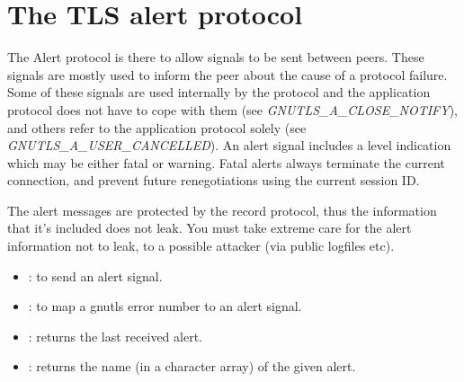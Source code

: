 \section{The TLS alert protocol}
\label{alert}

The Alert protocol
is there to allow signals to be sent between peers.
These signals are mostly used to inform the peer about the cause of
a protocol failure. Some of these signals are used internally by the
protocol and the application protocol does not have to cope with them
(see \emph{GNUTLS\_A\_CLOSE\_NOTIFY}), and others refer to the
application protocol solely (see \emph{GNUTLS\_A\_USER\_CANCELLED}).
An alert signal includes a level indication which may be either
fatal or warning. Fatal alerts always terminate the current connection,
and prevent future renegotiations using the current session ID.

\par The alert messages are protected by the record protocol, thus
the information that it's included does not leak. You must take
extreme care for the alert information not to leak, to a possible attacker
(via public logfiles etc).

\par
\begin{itemize}
\item {}:
to send an alert signal.
\item {}:
to map a gnutls error number to an alert signal.
\item {}:
returns the last received alert.
\item {}:
returns the name (in a character array) of the given alert.
\end{itemize}

